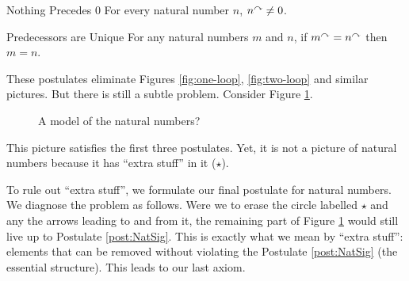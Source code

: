 \begin{postulate}{Nothing Precedes $0$}\label{post:NatZero}
  For every natural number $n$, $n^\curvearrowright\neq 0$.
\end{postulate}

\begin{postulate}{Predecessors are Unique}\label{post:NatPred}
  For any natural numbers $m$ and $n$, if $m^\curvearrowright=n^\curvearrowright$ then $m=n$.
\end{postulate}

These postulates eliminate Figures \ref{fig:one-loop}, \ref{fig:two-loop} and similar pictures.  
But there is still a subtle problem. 
Consider Figure \ref{fig:nonstandard}.

\begin{figure}[h]
  \centering
  \caption{A model of the natural numbers?}
  \label{fig:nonstandard}
\end{figure}

This picture satisfies the first three postulates. 
Yet, it is not a picture of natural numbers because it has ``extra stuff'' in it ($\star$).

\ipadbreak

To rule out ``extra stuff'', we formulate our final postulate for natural numbers.
We diagnose the problem as follows.
Were we to erase the circle labelled $\star$ and any the arrows leading to and from it, the remaining part of Figure \ref{fig:nonstandard} would still live up to Postulate \ref{post:NatSig}.
This is exactly what we mean by ``extra stuff'': 
elements that can be removed without violating the Postulate \ref{post:NatSig} (the essential structure). 
This leads to our last axiom. 

